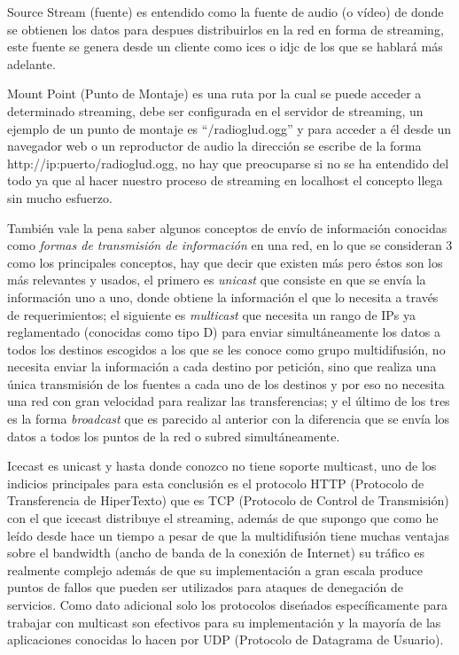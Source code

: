 \begin{multicols}{2}
Source Stream (fuente) es entendido como la fuente de audio (o vídeo) de donde se obtienen los datos para despues distribuirlos en la red en forma de streaming, este fuente se genera desde un cliente como ices o idjc de los que se hablará más adelante.

Mount Point (Punto de Montaje) es una ruta por la cual se puede acceder a determinado streaming, debe ser configurada en el servidor de streaming, un ejemplo de un punto de montaje es ``/radioglud.ogg'' y para acceder a él desde un navegador web o un reproductor de audio la dirección se escribe de la forma http://ip:puerto/radioglud.ogg, no hay que preocuparse si no se ha entendido del todo ya que al hacer nuestro proceso de streaming en localhost el concepto llega sin mucho esfuerzo.






También vale la pena saber algunos conceptos de envío de información conocidas como {\em formas de transmisión de información} en una red, en lo que se consideran 3 como los principales conceptos, hay que decir que existen más pero éstos son los más relevantes y usados, el primero es {\em unicast} que consiste en que se envía la información uno a uno, donde obtiene la información el que lo necesita a través de requerimientos; el siguiente es {\em multicast} que necesita un rango de IPs ya reglamentado (conocidas como tipo D) para enviar simultáneamente los datos a todos los destinos escogidos a los que se les conoce como grupo multidifusión, no necesita enviar la información a cada destino por petición, sino que realiza una única transmisión de los fuentes a cada uno de los destinos y por eso no necesita una red con gran velocidad para realizar las transferencias; y el último de los tres es la forma {\em broadcast} que es parecido al anterior con la diferencia que se envía los datos a todos los puntos de la red o subred simultáneamente.

Icecast es unicast y hasta donde conozco no tiene soporte multicast, uno de los indicios principales para esta conclusión es el protocolo HTTP (Protocolo de Transferencia de HiperTexto) que es TCP (Protocolo de Control de Transmisión) con el que icecast distribuye el streaming, además de que supongo que como he leído desde hace un tiempo a pesar de que la multidifusión tiene muchas ventajas sobre el bandwidth (ancho de banda de la conexión de Internet) su tráfico es realmente complejo además de que su implementación a gran escala produce puntos de fallos que pueden ser utilizados para ataques de denegación de servicios. Como dato adicional solo los protocolos diseńados específicamente para trabajar con multicast son efectivos para su implementación y la mayoría de las aplicaciones conocidas lo hacen por UDP (Protocolo de Datagrama de Usuario).


\end{multicols}
